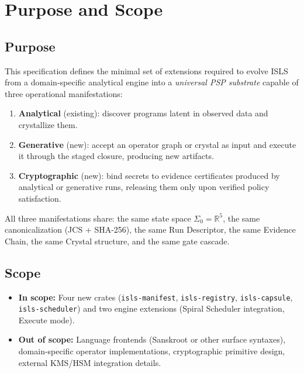 \documentclass[11pt,a4paper,twoside]{article}
\theoremstyle{definition}
\theoremstyle{plain}
\theoremstyle{remark}
\newcommand{\ISLS}{\textsf{ISLS}}
\newcommand{\RR}{\mathbb{R}}
\begin{document}
\section{Purpose and Scope}\label{sec:purpose}

\subsection{Purpose}

This specification defines the minimal set of extensions required to
evolve \ISLS{} from a domain-specific analytical engine into a
\emph{universal PSP substrate} capable of three operational
manifestations:

\begin{enumerate}[label=(\alph*)]
  \item \textbf{Analytical} (existing): discover programs latent in
        observed data and crystallize them.
  \item \textbf{Generative} (new): accept an operator graph or crystal
        as input and execute it through the staged closure, producing
        new artifacts.
  \item \textbf{Cryptographic} (new): bind secrets to evidence
        certificates produced by analytical or generative runs, releasing
        them only upon verified policy satisfaction.
\end{enumerate}

All three manifestations share: the same state space $\Sigma_0 = \RR^5$,
the same canonicalization (JCS + SHA-256), the same Run Descriptor, the
same Evidence Chain, the same Crystal structure, and the same gate
cascade.

\subsection{Scope}

\begin{itemize}[nosep]
  \item \textbf{In scope:} Four new crates (\texttt{isls-manifest},
        \texttt{isls-registry}, \texttt{isls-capsule},
        \texttt{isls-scheduler}) and two engine extensions (Spiral
        Scheduler integration, Execute mode).
  \item \textbf{Out of scope:} Language frontends (Sanskroot or other
        surface syntaxes), domain-specific operator implementations,
        cryptographic primitive design, external KMS/HSM integration
        details.
\end{itemize}
\end{document}
